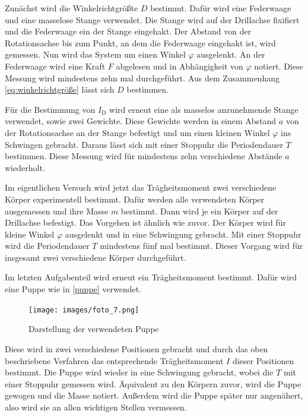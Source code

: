 Zunächst wird die Winkelrichtgrößte $D$ bestimmt. 
Dafür wird eine Federwaage und eine masselose Stange verwendet.
Die Stange wird auf der Drillachse fixifiert und die Federwaage ein der Stange eingehakt. 
Der Abstand von der Rotationsachse bis zum Punkt, an dem die Federwaage eingehakt ist, wird gemessen.
Nun wird das System um einen Winkel $\varphi$ ausgelenkt. 
An der Federwaage wird eine Kraft $F$ abgelesen und in Abhängigkeit von $\varphi$ notiert. 
Diese Messung wird mindestens zehn mal durchgeführt. 
Aus dem Zusammenhang \autoref{eq:winkelrichtgröße} lässt sich $D$ bestimmen.

Für die Bestimmung von $I_\text{D}$ wird erneut eine als masselos anzunehmende Stange verwendet, sowie zwei Gewichte.
Diese Gewichte werden in einem Abstand $a$ von der Rotationsachse an der Stange befestigt und um einen kleinen Winkel $\varphi$ ins Schwingen gebracht. 
Daraus lässt sich mit einer Stoppuhr die Periodendauer $T$ bestimmen. 
Diese Messung wird für mindestens zehn verschiedene Abstände $a$ wiederholt. 

Im eigentlichen Versuch wird jetzt das Trägheitsmoment zwei verschiedene Körper experimentell bestimmt. 
Dafür werden alle verwendeten Körper ausgemessen und ihre Masse $m$ bestimmt. 
Dann wird je ein Körper auf der Drillachse befestigt. 
Das Vorgehen ist ähnlich wie zuvor. 
Der Körper wird für kleine Winkel $\varphi$ ausgelenkt und in eine Schwingung gebracht. 
Mit einer Stoppuhr wird die Periodendauer $T$ mindestens fünf mal bestimmt. 
Dieser Vorgang wird für insgesamt zwei verschiedene Körper durchgeführt.

Im letzten Aufgabenteil wird erneut ein Trägheitsmoment bestimmt. Dafür wird eine Puppe wie in \autoref{puppe} verwendet.

\begin{figure}
    \centering
    \texttt{[image: images/foto\_7.png]}
    \caption{Darstellung der verwendeten Puppe \cite{V101}}
    \label{fig:puppe}
\end{figure}

Diese wird in zwei verschiedene Positionen gebracht und durch das oben beschriebene Verfahren das entsprechende Trägheitsmoment $I$ dieser Positionen bestimmt. 
Die Puppe wird wieder in eine Schwingung gebracht, wobei die $T$ mit einer Stoppuhr gemessen wird.
Äquivalent zu den Körpern zuvor, wird die Puppe gewogen und die Masse notiert. Außerdem wird die Puppe später nur angenähert, also wird sie an allen wichtigen Stellen vermessen.